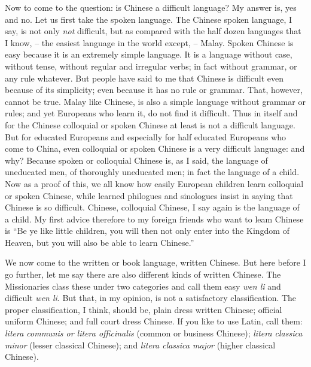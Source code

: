 Now to come to the question: is Chinese a difficult language?
My answer is, yes and no. Let us first take the spoken language.
The Chinese spoken language, I say, is not only \emph{not} difficult, but as compared with the half dozen languages that I know,
-- the easiest language in the world except,  -- Malay.
Spoken Chinese is easy because it is an extremely simple language.
It is a language without case, without tense, without regular and irregular verbs; in fact without grammar, or any rule whatever.
But people have said to me that Chinese is difficult even because of its simplicity; even because it has no rule or grammar.
That, however, cannot be true. Malay like Chinese, is also a simple language without grammar or rules; and yet Europeans who learn it, do not find it difficult.
Thus in itself and for the Chinese colloquial or spoken Chinese at least is not a difficult language.
But for educated Europeans and especially for half educated Europeans who come to China, even colloquial or spoken Chinese is a very difficult language: and why?
Because spoken or colloquial Chinese is, as I said, the language of uneducated men,
of thoroughly uneducated men;
in fact the language of a child.
Now as a proof of this, we all know how easily European children learn colloquial or spoken Chinese,
while learned philogues and sinologues insist in saying that Chinese is so difficult.
Chinese, colloquial Chinese, I say again is the language of a child.
My first advice therefore to my foreign friends who want to leam Chinese is
``Be ye like little children, you will then not only enter into the Kingdom of Heaven,
but you will also be able to learn Chinese.''

We now come to the written or book language, written Chinese.
But here before I go further, let me say there are also different kinds of written Chinese.
The Missionaries class these under two categories and call them easy \emph{wen li} and difficult \emph{wen li}.
But that, in my opinion, is not a satisfactory classification.
The proper classification, I think, should be,
plain dress written Chinese;
official uniform Chinese;
and full court dress Chinese.
If you like to use Latin, call them:
\emph{litera communis or litera officinalis} (common or business Chinese);
\emph{litera classica minor} (lesser classical Chinese);
and \emph{litera classica major} (higher classical Chinese).

